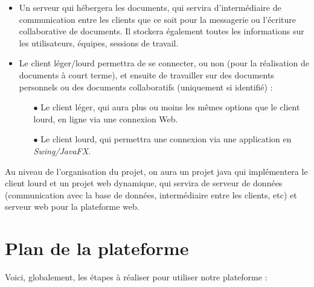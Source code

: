 		\begin{itemize}
		
			\item Un serveur qui hébergera les documents, qui servira d'intermédiaire de communication entre les clients que ce soit pour la messagerie ou l'écriture collaborative de documents. Il stockera également toutes les informations sur les utilisateurs, équipes, sessions de travail.
			
			\item Le client léger/lourd permettra de se connecter, ou non (pour la réalisation de documents à court terme), et ensuite de travailler sur des documents personnels ou des documents collaboratifs (uniquement si identifié) : \par
			
			\begin{itemize}
			
				\item[$\bullet$] Le client léger, qui aura plus ou moins les mêmes options que le client lourd, en ligne via une connexion Web.
				
				\item[$\bullet$] Le client lourd, qui permettra une connexion via une application en \textsl{Swing/JavaFX}.
			\end{itemize}
		\end{itemize}
		
		Au niveau de l'organisation du projet, on aura un projet java qui implémentera le client lourd et un projet web dynamique, qui servira de serveur de données (communication avec la base de données, intermédiaire entre les clients, etc) et serveur web pour la plateforme web. 
		
	\section{Plan de la plateforme}

	Voici, globalement, les étapes à réaliser pour utiliser notre plateforme :
	
